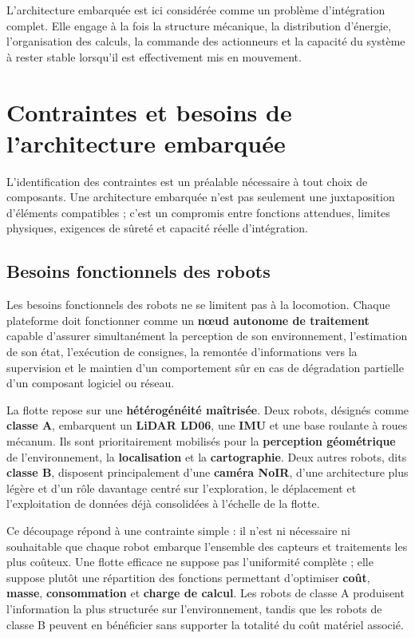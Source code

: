 \documentclass[11pt,a4paper]{report}
\newcommand{\kw}[1]{\textbf{#1}}
\begin{document}
L’architecture embarquée est ici considérée comme un problème d’intégration complet. Elle engage à la fois la structure mécanique, la distribution d’énergie, l’organisation des calculs, la commande des actionneurs et la capacité du système à rester stable lorsqu’il est effectivement mis en mouvement.

\section{Contraintes et besoins de l'architecture embarquée}

L’identification des contraintes est un préalable nécessaire à tout choix de composants. Une architecture embarquée n’est pas seulement une juxtaposition d’éléments compatibles ; c’est un compromis entre fonctions attendues, limites physiques, exigences de sûreté et capacité réelle d’intégration.

\subsection{Besoins fonctionnels des robots}

Les besoins fonctionnels des robots ne se limitent pas à la locomotion. Chaque plateforme doit fonctionner comme un \kw{nœud autonome de traitement} capable d’assurer simultanément la perception de son environnement, l’estimation de son état, l’exécution de consignes, la remontée d’informations vers la supervision et le maintien d’un comportement sûr en cas de dégradation partielle d’un composant logiciel ou réseau.

La flotte repose sur une \kw{hétérogénéité maîtrisée}. Deux robots, désignés comme \kw{classe A}, embarquent un \kw{LiDAR LD06}, une \kw{IMU} et une base roulante à roues mécanum. Ils sont prioritairement mobilisés pour la \kw{perception géométrique} de l’environnement, la \kw{localisation} et la \kw{cartographie}. Deux autres robots, dits \kw{classe B}, disposent principalement d’une \kw{caméra NoIR}, d’une architecture plus légère et d’un rôle davantage centré sur l’exploration, le déplacement et l’exploitation de données déjà consolidées à l’échelle de la flotte.

Ce découpage répond à une contrainte simple : il n’est ni nécessaire ni souhaitable que chaque robot embarque l’ensemble des capteurs et traitements les plus coûteux. Une flotte efficace ne suppose pas l’uniformité complète ; elle suppose plutôt une répartition des fonctions permettant d’optimiser \kw{coût}, \kw{masse}, \kw{consommation} et \kw{charge de calcul}. Les robots de classe A produisent l’information la plus structurée sur l’environnement, tandis que les robots de classe B peuvent en bénéficier sans supporter la totalité du coût matériel associé.
\end{document}
